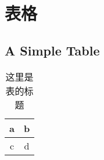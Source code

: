﻿\chapter{表格}

\section{A Simple Table}
\begin{table}[htbp]
\centering
\caption{这里是表的标题} \label{tab:simpletable}
\begin{tabular}{|c|c|}
    \hline
    a & b \\
    \hline
    c & d \\
    \hline
\end{tabular}
\end{table}

